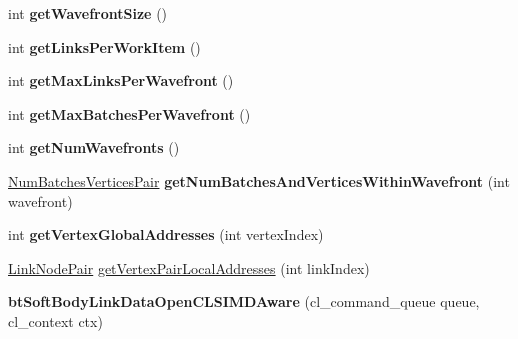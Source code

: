 \begin{DoxyCompactItemize}
\item 
\mbox{\label{classbtSoftBodyLinkDataOpenCLSIMDAware_aebd97637efa9006aa0a8dc7e0d3399b4}} 
int {\bfseries get\+Wavefront\+Size} ()
\item 
\mbox{\label{classbtSoftBodyLinkDataOpenCLSIMDAware_aba4551d9c0fd8035ff1db4b5584ce2c9}} 
int {\bfseries get\+Links\+Per\+Work\+Item} ()
\item 
\mbox{\label{classbtSoftBodyLinkDataOpenCLSIMDAware_aa06ef3fc9271423186db2993834acf13}} 
int {\bfseries get\+Max\+Links\+Per\+Wavefront} ()
\item 
\mbox{\label{classbtSoftBodyLinkDataOpenCLSIMDAware_aa70ec1e6f3a5c2e00e2bb7e9ca77487f}} 
int {\bfseries get\+Max\+Batches\+Per\+Wavefront} ()
\item 
\mbox{\label{classbtSoftBodyLinkDataOpenCLSIMDAware_a9c043815f72b537dfa3dce9b23efbc94}} 
int {\bfseries get\+Num\+Wavefronts} ()
\item 
\mbox{\label{classbtSoftBodyLinkDataOpenCLSIMDAware_a9fe26bb2f2461f8a34157eac83d30e0c}} 
\hyperlink{structbtSoftBodyLinkDataOpenCLSIMDAware_1_1NumBatchesVerticesPair}{Num\+Batches\+Vertices\+Pair} {\bfseries get\+Num\+Batches\+And\+Vertices\+Within\+Wavefront} (int wavefront)
\item 
\mbox{\label{classbtSoftBodyLinkDataOpenCLSIMDAware_a755a465a5e26910287ddbed34ae96a5c}} 
int {\bfseries get\+Vertex\+Global\+Addresses} (int vertex\+Index)
\item 
\hyperlink{classbtSoftBodyLinkData_1_1LinkNodePair}{Link\+Node\+Pair} \hyperlink{classbtSoftBodyLinkDataOpenCLSIMDAware_a02bb3654ae8ced9acdae914a23e0ae2b}{get\+Vertex\+Pair\+Local\+Addresses} (int link\+Index)
\item 
\mbox{\label{classbtSoftBodyLinkDataOpenCLSIMDAware_ae2bb335b68de0888086496e38f6208b7}} 
{\bfseries bt\+Soft\+Body\+Link\+Data\+Open\+C\+L\+S\+I\+M\+D\+Aware} (cl\+\_\+command\+\_\+queue queue, cl\+\_\+context ctx)

\end{DoxyCompactItemize}
